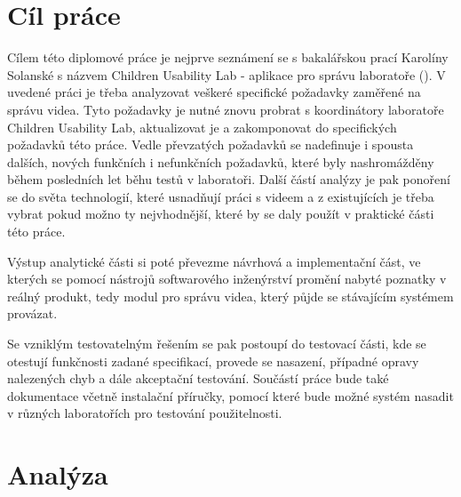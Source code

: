 \documentclass[thesis=M,czech]{FITthesis}[2012/06/26]
\begin{document}
\chapter{Cíl práce}
Cílem této diplomové práce je nejprve seznámení se s bakalářskou prací Karolíny Solanské s názvem Children Usability Lab - aplikace pro správu laboratoře (\cite{solankar}). V uvedené práci je třeba analyzovat veškeré specifické požadavky zaměřené na správu videa. Tyto požadavky je nutné znovu probrat s koordinátory  laboratoře Children Usability Lab, aktualizovat je a zakomponovat do specifických požadavků této práce. Vedle převzatých požadavků se nadefinuje i spousta dalších, nových funkčních i nefunkčních požadavků, které byly nashromážděny během posledních let běhu testů v laboratoři. Další částí analýzy je pak ponoření se do světa technologií, které usnadňují práci s videem a z existujících je třeba vybrat pokud možno ty nejvhodnější, které by se daly použít v praktické části této práce.
	
	Výstup analytické části si poté převezme návrhová a implementační část, ve kterých se pomocí nástrojů softwarového inženýrství promění nabyté poznatky v reálný produkt, tedy modul pro správu videa, který půjde se stávajícím systémem provázat.
	
	Se vzniklým testovatelným řešením se pak postoupí do testovací části, kde se otestují funkčnosti zadané specifikací, provede se nasazení, případné opravy nalezených chyb a dále akceptační testování.
Součástí práce bude také dokumentace včetně instalační příručky, pomocí které bude možné systém nasadit v různých laboratořích pro testování použitelnosti.

\chapter{Analýza}
\end{document}
